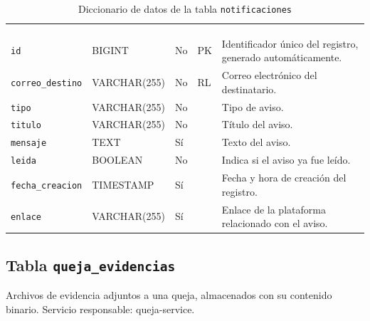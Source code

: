 \footnotesize
\renewcommand{\arraystretch}{1.15}
\setlength{\tabcolsep}{4pt}
\begin{longtable}{|L{3.9cm}|L{2.4cm}|L{0.9cm}|L{1.2cm}|L{6.6cm}|}
	\hiderowcolors\caption{Diccionario de datos de la tabla \texttt{notificaciones}}
	\label{tab:dic_notificaciones} \\ \showrowcolors
	\hline
	 &  &  &  &  \\
	\hline
	\endfirsthead
	\hline
	 &  &  &  &  \\
	\hline
	\endhead
		\texttt{id} & BIGINT & No & PK & Identificador único del registro, generado automáticamente. \\ \hline
		\texttt{correo\_\allowbreak{}destino} & VARCHAR(255) & No & RL & Correo electrónico del destinatario. \\ \hline
		\texttt{tipo} & VARCHAR(255) & No &  & Tipo de aviso. \\ \hline
		\texttt{titulo} & VARCHAR(255) & No &  & Título del aviso. \\ \hline
		\texttt{mensaje} & TEXT & Sí &  & Texto del aviso. \\ \hline
		\texttt{leida} & BOOLEAN & No &  & Indica si el aviso ya fue leído. \\ \hline
		\texttt{fecha\_\allowbreak{}creacion} & TIMESTAMP & Sí &  & Fecha y hora de creación del registro. \\ \hline
		\texttt{enlace} & VARCHAR(255) & Sí &  & Enlace de la plataforma relacionado con el aviso. \\ \hline
\end{longtable}
\normalsize
\setlength{\tabcolsep}{6pt}
\renewcommand{\arraystretch}{1}

\subsection{Tabla \texttt{queja\_evidencias}}
Archivos de evidencia adjuntos a una queja, almacenados con su contenido binario. Servicio responsable: queja-service.


